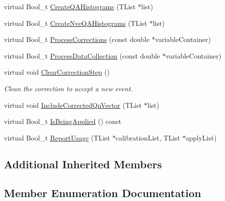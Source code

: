\begin{DoxyCompactItemize}
virtual Bool\+\_\+t \mbox{\hyperlink{classQn_1_1TwistAndRescale_a048fe37fdbd61696d5b0ed7eadbde1d1}{Create\+Q\+A\+Histograms}} (T\+List $\ast$list)
\item 
virtual Bool\+\_\+t \mbox{\hyperlink{classQn_1_1TwistAndRescale_ae60ae563330df4beb9edd3fb99a9fc31}{Create\+Nve\+Q\+A\+Histograms}} (T\+List $\ast$list)
\item 
virtual Bool\+\_\+t \mbox{\hyperlink{classQn_1_1TwistAndRescale_a3bc16721deb0f73dbfcf0ae6cabe5b54}{Process\+Corrections}} (const double $\ast$variable\+Container)
\item 
virtual Bool\+\_\+t \mbox{\hyperlink{classQn_1_1TwistAndRescale_ac0392e263ff658b876821ac06d5b2eff}{Process\+Data\+Collection}} (const double $\ast$variable\+Container)
\item 
\mbox{\label{classQn_1_1TwistAndRescale_a07d06e5a437221d08bdba6078af1c596}} 
virtual void \mbox{\hyperlink{classQn_1_1TwistAndRescale_a07d06e5a437221d08bdba6078af1c596}{Clear\+Correction\+Step}} ()
\begin{DoxyCompactList}\small\item\em Clean the correction to accept a new event. \end{DoxyCompactList}\item 
virtual void \mbox{\hyperlink{classQn_1_1TwistAndRescale_aad00583024f1a71458d6c86ba1cc4d44}{Include\+Corrected\+Qn\+Vector}} (T\+List $\ast$list)
\item 
virtual Bool\+\_\+t \mbox{\hyperlink{classQn_1_1TwistAndRescale_a82b3138efce50ea788122dd26ca964d7}{Is\+Being\+Applied}} () const
\item 
virtual Bool\+\_\+t \mbox{\hyperlink{classQn_1_1TwistAndRescale_a2a6c985100656523b3d834a31d8f19a8}{Report\+Usage}} (T\+List $\ast$calibration\+List, T\+List $\ast$apply\+List)
\end{DoxyCompactItemize}
\subsection*{Additional Inherited Members}


\subsection{Member Enumeration Documentation}
\mbox{\label{classQn_1_1TwistAndRescale_a04bae5b47174d3536e1f6ac8499b982f}} 
